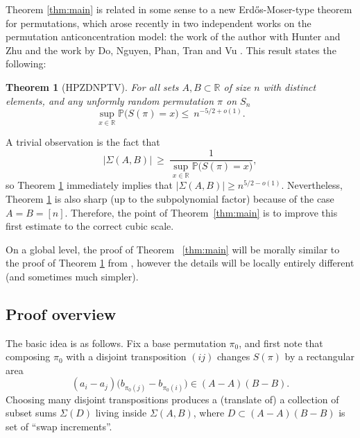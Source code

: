 \documentclass[12pt]{amsart}
\newtheorem{theorem}{Theorem}[section]
\theoremstyle{definition}
\theoremstyle{remark}
\newcommand{\RR}{\mathbb{R}}
\newcommand{\PP}{\mathbb{P}}
\newcommand{\abs}[1]{\left|#1\right|}
\newcommand{\Sig}{\Sigma}
\begin{document}
Theorem \ref{thm:main} is related in some sense to a new Erd\H{o}s-Moser-type theorem for permutations, which arose recently in two independent works on the permutation anticoncentration model: the work of the author with Hunter and Zhu \cite{HPZ26} and the work by Do, Nguyen, Phan, Tran and Vu \cite{DNPTV25}. This result states the following:

\begin{theorem}[HPZDNPTV]\label{thm:EM-context}
For all sets $A,B\subset\RR$ of size $n$ with distinct elements, and any unformly random permutation $\pi$ on $S_n$
\[
\sup_{x\in\RR}\PP\bigl(S(\pi)=x\bigr) \le\ n^{-5/2+o(1)}.\qquad
\]
\end{theorem}
A trivial observation is the fact that
\begin{equation*}
\abs{\Sig(A,B)}\ \ge\ \frac{1}{\sup_{x\in\RR}\PP\bigl(S(\pi)=x\bigr)},
\end{equation*}
so Theorem \ref{thm:EM-context} immediately implies that $\abs{\Sig(A,B)}\ge n^{5/2-o(1)}$. Nevertheless, Theorem \ref{thm:EM-context} is also sharp (up to the subpolynomial factor) because of the case $A=B=[n]$. Therefore, the point of Theorem~\ref{thm:main} is to improve this first estimate to the correct cubic scale.

On a global level, the proof of Theorem ~\ref{thm:main} will be morally similar to the proof of Theorem \ref{thm:EM-context} from \cite{HPZ26}, however the details will be locally entirely different (and sometimes much simpler). 

\subsection*{Proof overview}

The basic idea is as follows. Fix a base permutation $\pi_0$, and first note that composing $\pi_0$ with a disjoint transposition $(ij)$ changes
$S(\pi)$ by a rectangular area
\[
(a_i-a_j)\bigl(b_{\pi_0(j)}-b_{\pi_0(i)}\bigr) \in (A-A)(B-B).
\]
Choosing many disjoint transpositions produces a (translate of) a collection of subset sums $\Sig(D)$ living inside
$\Sig(A,B)$, where $D \subset (A-A)(B-B)$ is set of ``swap increments''. 
\end{document}
